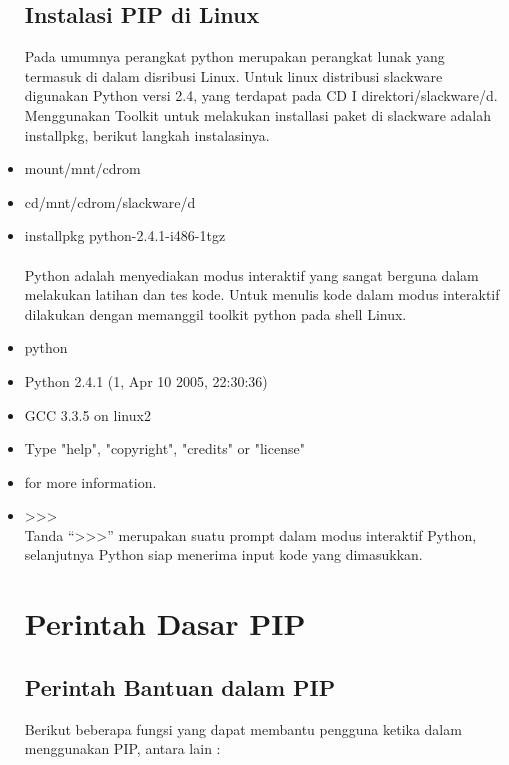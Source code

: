 \documentclass[12pt,a4paper]{article}
\begin{document}
\begin{itemize}
\subsection{Instalasi PIP di Linux}
Pada umumnya perangkat python merupakan perangkat lunak yang termasuk di dalam disribusi Linux. Untuk linux distribusi slackware digunakan Python versi 2.4, yang terdapat pada CD I direktori/slackware/d. Menggunakan Toolkit untuk melakukan installasi paket di slackware adalah installpkg, berikut langkah instalasinya.\\
\item  mount/mnt/cdrom\\
\item  cd/mnt/cdrom/slackware/d\\
\item  installpkg python-2.4.1-i486-1tgz\\
\\
Python adalah menyediakan modus interaktif yang sangat berguna dalam melakukan latihan dan tes kode. Untuk menulis kode dalam modus interaktif dilakukan dengan memanggil toolkit python pada shell Linux. \\
\item  python\\
\item Python 2.4.1 (1, Apr 10 2005, 22:30:36) \\
\item GCC 3.3.5 on linux2 \\
\item Type "help", "copyright", "credits" or "license" \\
\item for more information.\\
\item  >>>\\
 Tanda “>>>” merupakan suatu prompt dalam modus interaktif Python, selanjutnya Python siap menerima input kode yang dimasukkan.\\

\section{Perintah Dasar PIP}
\subsection{Perintah Bantuan dalam PIP}
Berikut beberapa fungsi yang dapat membantu pengguna ketika dalam menggunakan PIP, antara lain :

\end{itemize}
\end{document}

